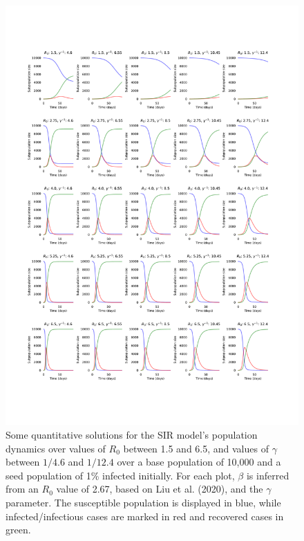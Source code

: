 \documentclass{article}
\begin{document}
\begin{figure}
	\includegraphics[width=\linewidth]{figures/fig1-odes}
	\caption{Some quantitative solutions for the SIR model's population dynamics over values of $R_0$ between 1.5 and 6.5, and values of $\gamma$ between $1/4.6$ and $1/12.4$ over a base population of 10,000 and a seed population of 1\% infected initially. For each plot, $\beta$ is inferred from an $R_0$ value of 2.67, based on Liu et al. (2020),\cite{liu2020reproductive} and the $\gamma$ parameter. The susceptible population is displayed in blue, while infected/infectious cases are marked in red and recovered cases in green.}
	\label{fig:ode_solutions}
\end{figure}
\end{document}

